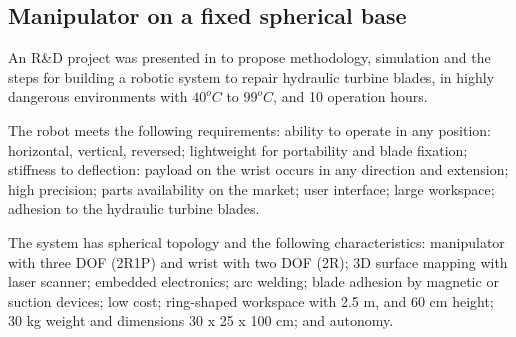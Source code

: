 \subsection{Manipulator on a fixed spherical base}
An R\&D project was presented in \cite{motta2010prototype} to propose
methodology, simulation and the steps for building a robotic system to repair
hydraulic turbine blades,%
 in highly dangerous environments with $ 40^o C$ to $ 99^o C$, and 10 operation
 hours.

The robot meets the following requirements: ability to operate in any position:
horizontal, vertical, reversed; lightweight for portability and blade fixation;
stiffness to deflection: payload on the wrist occurs in any direction and
extension; high precision; parts availability on the market; user interface;
large workspace; adhesion to the hydraulic turbine blades.


The system has spherical topology and the following characteristics: manipulator
with three DOF (2R1P) and wrist with two DOF (2R); 3D surface mapping with laser
scanner; embedded electronics; arc welding; blade adhesion by magnetic or
suction devices; low cost; ring-shaped workspace with 2.5 m, and 60 cm height;
30 kg weight and dimensions 30 x 25 x 100 cm; and autonomy.

